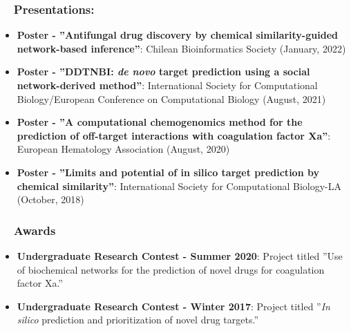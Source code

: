 \documentclass[letter,20pt]{article}
\newcommand{\resumeItem}[2]{
  \item\small{
    \textbf{#1}{: #2 \vspace{-2pt}}
  }
}
\newcommand{\resumeSubItem}[2]{\resumeItem{#1}{#2}\vspace{-3pt}}
\newcommand{\resumeSubHeadingListStart}{\begin{itemize}[leftmargin=*]}
\newcommand{\resumeSubHeadingListEnd}{\end{itemize}}
\begin{document}
\subsubsection*{~~Presentations:}
\resumeSubHeadingListStart
\resumeSubItem{Poster -  ''Antifungal drug discovery by chemical similarity-guided network-based inference''}{Chilean Bioinformatics Society (January, 2022)}
\vspace{2pt}
\resumeSubItem{Poster - ''DDTNBI: \textit{de novo} target prediction using a social network-derived method''}{International Society for Computational Biology/European Conference on Computational Biology (August, 2021)}
\vspace{2pt}
\resumeSubItem{Poster - ''A computational chemogenomics method for the prediction of off-target interactions with coagulation factor Xa''}{European Hematology Association (August, 2020)}
\vspace{2pt}
\resumeSubItem{Poster - ''Limits and potential of in silico target prediction by chemical similarity''}{International Society for Computational Biology-LA (October, 2018)}
\resumeSubHeadingListEnd
\vspace{-5pt}

\subsubsection*{~~Awards}
\resumeSubHeadingListStart
	\resumeSubItem{Undergraduate Research Contest - Summer 2020}{Project titled ''Use of biochemical networks for the prediction of novel drugs for coagulation factor Xa.''}
\resumeSubItem{Undergraduate Research Contest - Winter 2017}{Project titled ''\textit{In silico} prediction and prioritization of novel drug targets.''}
\vspace{2pt}
\resumeSubHeadingListEnd
\end{document}

